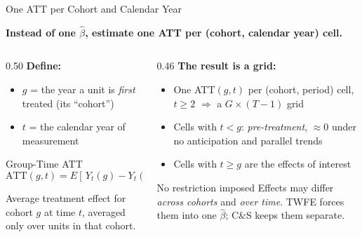 \documentclass[main.tex]{subfiles}
\begin{document}
\begin{frame}{One ATT per Cohort and Calendar Year}

  \textbf{Instead of one $\hat{\beta}$, estimate one ATT per
  (cohort, calendar year) cell.}

  \bigskip
  \begin{columns}[T]
    \begin{column}{0.50\textwidth}
      \textbf{Define:}
      \begin{itemize}
        \item $g$ = the year a unit is \emph{first} treated
          (its ``cohort'')
        \item $t$ = the calendar year of measurement
      \end{itemize}

      \bigskip
      \begin{block}{Group-Time ATT}
        \[
          \text{ATT}(g,t) = E\!\left[\,Y_t(g) - Y_t(0)\;\middle|\;G=g\,\right]
        \]
      \end{block}

      \medskip
      Average treatment effect for cohort $g$ at time $t$,
      averaged only over units in that cohort.
    \end{column}
    \begin{column}{0.46\textwidth}
      \textbf{The result is a grid:}
      \begin{itemize}
        \item One ATT$(g,t)$ per (cohort, period) cell, $t \ge 2$
          $\Rightarrow$ a $G \times (T{-}1)$ grid
        \item Cells with $t < g$: \emph{pre-treatment}, $\approx 0$
          under no anticipation and parallel trends
        \item Cells with $t \geq g$ are the effects of interest
      \end{itemize}

      \medskip
      \begin{block}{No restriction imposed}
        Effects may differ \emph{across cohorts} and
        \emph{over time}. TWFE forces them into one $\hat\beta$;
        C\&S keeps them separate.
      \end{block}
    \end{column}
  \end{columns}

\end{frame}
\end{document}
